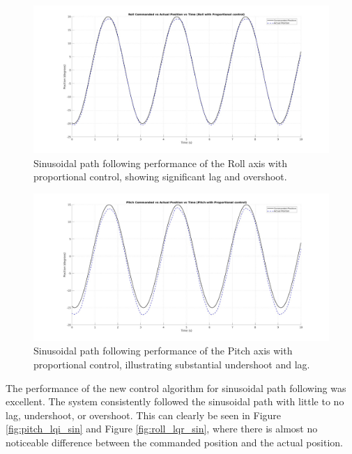 \begin{figure}[h!]
    \centering
    \includegraphics[width=1.0\linewidth]{figures/roll_p_sin.jpg}
    \caption{Sinusoidal path following performance of the Roll axis with proportional control, showing significant lag and overshoot.}
    \label{fig:roll_p_sin}
\end{figure}

\begin{figure}[h!]
    \centering
    \includegraphics[width=1.00\linewidth]{figures/pitch_p_sin.jpg}
    \caption{Sinusoidal path following performance of the Pitch axis with proportional control, illustrating substantial undershoot and lag.}
    \label{fig:pitch_p_sin}
\end{figure}

The performance of the new control algorithm for sinusoidal path following was excellent. The system consistently followed the sinusoidal path with little to no lag, undershoot, or overshoot. This can clearly be seen in Figure \ref{fig:pitch_lqi_sin} and Figure \ref{fig:roll_lqr_sin}, where there is almost no noticeable difference between the commanded position and the actual position.


